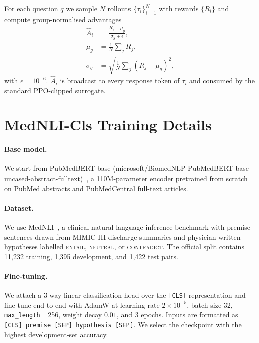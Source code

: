 \documentclass[11pt]{article}
\begin{document}
For each question $q$ we sample $N$ rollouts
$\{\tau_i\}_{i=1}^{N}$ with rewards $\{R_i\}$ and compute
group-normalised advantages
\begin{align}
\hat{A}_i &= \frac{R_i - \mu_g}{\sigma_g + \epsilon}, \\
\mu_g &= \tfrac{1}{N}\sum_j R_j, \\
\sigma_g &= \sqrt{\tfrac{1}{N}\sum_j (R_j - \mu_g)^2},
\end{align}
with $\epsilon = 10^{-6}$. $\hat{A}_i$ is broadcast to
every response token of $\tau_i$ and consumed by the
standard PPO-clipped surrogate.

\section{MedNLI-Cls Training Details}
\label{app:pubmedbert}

\paragraph{Base model.}
We start from PubMedBERT-base
(microsoft/BiomedNLP-PubMedBERT-base-uncased-abstract-fulltext)~\citep{gu2021domain},
a 110M-parameter encoder pretrained from scratch on
PubMed abstracts and PubMedCentral full-text articles.

\paragraph{Dataset.}
We use MedNLI~\citep{romanov2018lessons}, a clinical
natural language inference benchmark with premise sentences
drawn from MIMIC-III discharge summaries and physician-written
hypotheses labelled \textsc{entail}, \textsc{neutral}, or
\textsc{contradict}. The official split contains 11{,}232
training, 1{,}395 development, and 1{,}422 test pairs.

\paragraph{Fine-tuning.}
We attach a 3-way linear classification head over the
\texttt{[CLS]} representation and fine-tune end-to-end with
AdamW at learning rate $2\times10^{-5}$, batch size 32,
\texttt{max\_length}\,=\,256, weight decay $0.01$, and
3 epochs. Inputs are formatted as
\texttt{[CLS] premise [SEP] hypothesis [SEP]}.
We select the checkpoint with the highest development-set
accuracy.
\end{document}
